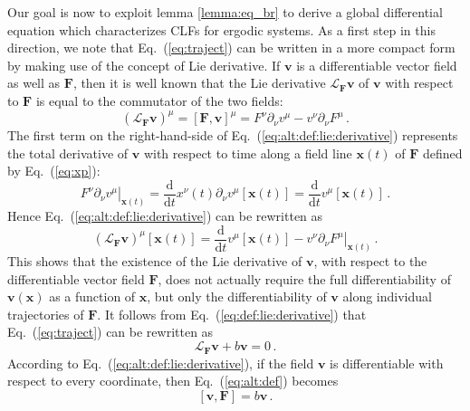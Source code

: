 \documentclass{article}
\theoremstyle{plain}
\theoremstyle{definition}
\theoremstyle{remark}
\newcommand{\vect}[1]{\boldsymbol{#1}}
\begin{document}
Our goal is now to exploit lemma \ref{lemma:eq_br}
to derive a global differential equation which characterizes CLFs for
ergodic systems. As a first step in this direction, we note that
Eq.~(\ref{eq:traject}) can be written in a more compact form by
making use of the concept of Lie derivative. If $\vect{v}$ is a
differentiable vector field as well as $\vect{F}$, then it is well known
that the Lie derivative $\mathcal{L}_{\vect{F}}\vect{v}$ 
of $\vect{v}$ with
respect to $\vect{F}$ is equal to the commutator of the two fields:
\begin{equation} \label{eq:alt:def:lie:derivative}
 \left( \mathcal{L}_{\vect{F}} \vect{v}\right)^{\mu}  =
\left[\vect{F},\vect{v}\right]^\mu =
  F^{\nu} \partial_{\nu} v^{\mu} - v^{\nu} \partial_\nu F^{\mu} \, .
\end{equation}
The first term on the right-hand-side of
Eq.~(\ref{eq:alt:def:lie:derivative}) represents the total derivative of
$\vect{v}$ with respect to time along a field line $\vect{x}(t)$ of 
$\vect{F}$ defined by Eq.~(\ref{eq:xp}):
\[
\left. F^{\nu}  \partial_{\nu} v^{\mu}\right |_{\vect{x}(t)}
=\frac{\mathrm{d}}{\mathrm{d}t} x^{\nu}(t)
\partial_{\nu} v^{\mu}\left[\vect{x}(t)\right] 
=\frac{\mathrm{d}}{\mathrm{d} t}
  v^{\mu}\left[\vect{x}(t) \right] \,.
\]
Hence Eq.~(\ref{eq:alt:def:lie:derivative}) can be rewritten as
\begin{equation} \label{eq:def:lie:derivative}
  \left(\mathcal{L}_{\vect{F}} \vect{v}\right)^{\mu} \left[\vect{x}(t)\right] =
  \frac{\mathrm{d}}{\mathrm{d} t}
  v^{\mu}\left[\vect{x}(t) \right] -
  \left. v^{\nu} \partial_\nu F^{\mu}\right |_{\vect{x}(t)} \, .
\end{equation}
This shows that the existence of the Lie derivative of $\vect{v}$, with respect
to the differentiable vector field $\vect{F}$, does not actually require the full
differentiability of $\vect{v}(\vect x)$ as a function of $\vect x$, but only the
differentiability of $\vect{v}$ along individual trajectories of $\vect{F}$.
It follows from Eq.~(\ref{eq:def:lie:derivative}) that
Eq.~(\ref{eq:traject}) can be rewritten as
 \begin{equation}
    \mathcal{L}_{\vect{F}} \vect{v} + b \vect v = 0 \,.
    \label{eq:alt:def}
  \end{equation}  
According to Eq.~(\ref{eq:alt:def:lie:derivative}), if
the field $\vect{v}$ is differentiable with respect to every coordinate,
then Eq.~(\ref{eq:alt:def}) becomes
\begin{equation} \label{eq:alt:def:commutator}
  \left[\vect{v}, \vect{F}\right] = b \vect v\,.
\end{equation} 
\end{document}
